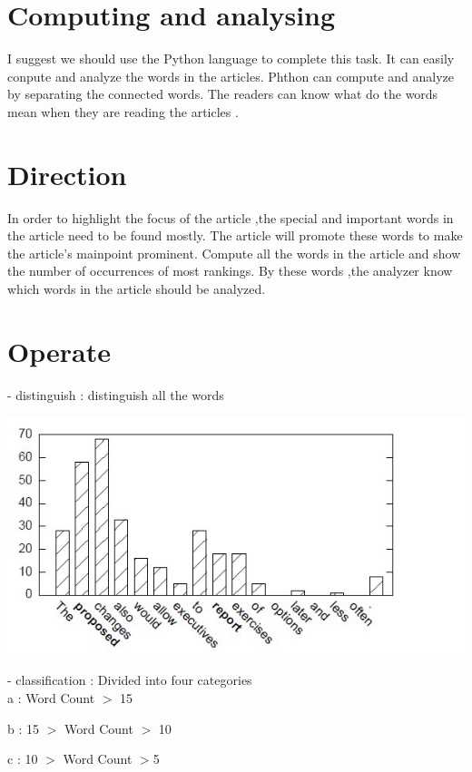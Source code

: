 \section*{Computing and analysing}
I suggest we should use the Python language to complete this task. 
It can easily conpute and analyze the words in the articles.
Phthon can compute and analyze by separating the connected words.
The readers can know what do the words mean when they are reading the articles .

\section*{Direction}
\label{sec:prob}


In order to highlight the focus of the article ,the special and important words in the article need to be found mostly.
The article will promote these words to make the article's mainpoint prominent.
Compute all the words in the article and show the number of occurrences of most rankings.
By these words ,the analyzer know which words in the article should be analyzed.


\section*{Operate}
\label{sec:meth}
- distinguish     : distinguish all the words \\
\begin{center}
	\includegraphics[width=\columnwidth]{union_01.jpg}
\end{center}
- classification   : Divided into four categories \\


a : Word Count $>$ 15 

b : 15 $>$ Word Count $>$ 10

c : 10 $>$ Word Count $>$5 

